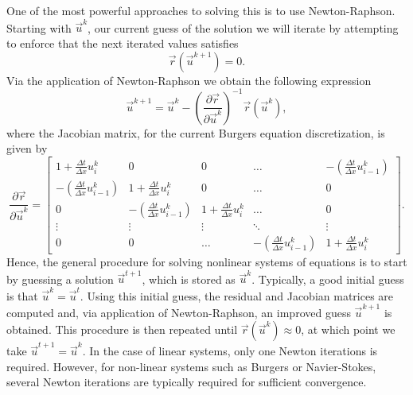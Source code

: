 One of the most powerful approaches to solving this is to use Newton-Raphson. Starting with $\vec{u}^{k}$, our current guess of the solution we will iterate by attempting to enforce that the next iterated values satisfies
\begin{equation}
	\vec{r}(\vec{u}^{k+1}) = 0.
\end{equation}
Via the application of Newton-Raphson we obtain the following expression
\begin{equation}
	\vec{u}^{k+1} = \vec{u}^{k} - \left(\frac{\partial \vec{r}}{\partial \vec{u}^k}\right)^{-1} \vec{r}(\vec{u}^{k}),
\end{equation}
where the Jacobian matrix, for the current Burgers equation discretization, is given by
\begin{equation}
	\frac{\partial \vec{r}}{\partial \vec{u}^k} = 
	\begin{bmatrix}
	    1 + \frac{\Delta t}{\Delta x}u_i^{k} & 0 & 0 & \dots  & - \left(\frac{\Delta t}{\Delta x} u_{i-1}^{k}\right) \\
	    - \left(\frac{\Delta t}{\Delta x} u_{i-1}^{k}\right) & 1 + \frac{\Delta t}{\Delta x}u_i^{k} & 0 & \dots  & 0 \\
			0 & - \left(\frac{\Delta t}{\Delta x} u_{i-1}^{k}\right) & 1 + \frac{\Delta t}{\Delta x}u_i^{k} & \dots  & 0 \\
	    \vdots & \vdots & \vdots & \ddots & \vdots \\
	    0 & 0 & \dots & - \left(\frac{\Delta t}{\Delta x} u_{i-1}^{k}\right)  & 1 + \frac{\Delta t}{\Delta x}u_i^{k}
	\end{bmatrix}.
\end{equation}
Hence, the general procedure for solving nonlinear systems of equations is to start by guessing a solution $\vec{u}^{t+1}$, which is stored as $\vec{u}^{k}$. Typically, a good initial guess is that $\vec{u}^{k} = \vec{u}^{t}$. Using this initial guess, the residual and Jacobian matrices are computed and, via application of Newton-Raphson, an improved guess $\vec{u}^{k+1}$ is obtained. This procedure is then repeated until $\vec{r}(\vec{u}^{k}) \approx 0$, at which point we take $\vec{u}^{t+1} = \vec{u}^{k}$. In the case of linear systems, only one Newton iterations is required. However, for non-linear systems such as Burgers or Navier-Stokes, several Newton iterations are typically required for sufficient convergence.

